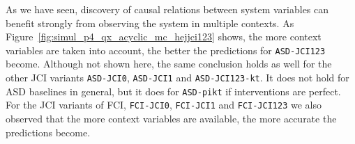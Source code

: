 \documentclass[twoside,11pt]{article}
\newcommand{\alg}[1]{\texttt{#1}}
\begin{document}
\begin{comment}
\texttt{[image: \{linear\_stochastic\_4\_x\_0.5\_0.5\_500\_1\_1\_LEG\_sys2sys\_edge\_hej-jci123]}.png}
}
\centerline{%
\texttt{[image: \{linear\_stochastic\_4\_x\_0.5\_0.5\_500\_1\_1\_ROC\_sys2sys\_conf\_hej-jci123]}.png}
\texttt{[image: \{linear\_stochastic\_4\_x\_0.5\_0.5\_500\_1\_1\_PR1\_sys2sys\_conf\_hej-jci123]}.png}
\texttt{[image: \{linear\_stochastic\_4\_x\_0.5\_0.5\_500\_1\_1\_PR0\_sys2sys\_conf\_hej-jci123]}.png}
\texttt{[image: \{linear\_stochastic\_4\_x\_0.5\_0.5\_500\_1\_1\_LEG\_sys2sys\_conf\_hej-jci123]}.png}
}
\caption{Taking into account more context variables leads to better predictions for \alg{ASD-JCI123}
(acyclic, perfect interventions).\label{fig:simul_p4_qx_acyclic_pi_hejjci123}}
\end{figure}
\begin{figure}
\centerline{%
\texttt{[image: \{linear\_stochastic\_4\_x\_0.5\_0.5\_500\_0\_1\_ROC\_sys2sys\_arel\_hej-jci123]}.png}
\texttt{[image: \{linear\_stochastic\_4\_x\_0.5\_0.5\_500\_0\_1\_PR1\_sys2sys\_arel\_hej-jci123]}.png}
\texttt{[image: \{linear\_stochastic\_4\_x\_0.5\_0.5\_500\_0\_1\_PR0\_sys2sys\_arel\_hej-jci123]}.png}
\texttt{[image: \{linear\_stochastic\_4\_x\_0.5\_0.5\_500\_0\_1\_LEG\_sys2sys\_arel\_hej-jci123]}.png}
}
\centerline{%
\texttt{[image: \{linear\_stochastic\_4\_x\_0.5\_0.5\_500\_0\_1\_ROC\_sys2sys\_edge\_hej-jci123]}.png}
\texttt{[image: \{linear\_stochastic\_4\_x\_0.5\_0.5\_500\_0\_1\_PR1\_sys2sys\_edge\_hej-jci123]}.png}
\texttt{[image: \{linear\_stochastic\_4\_x\_0.5\_0.5\_500\_0\_1\_PR0\_sys2sys\_edge\_hej-jci123]}.png}
\texttt{[image: \{linear\_stochastic\_4\_x\_0.5\_0.5\_500\_0\_1\_LEG\_sys2sys\_edge\_hej-jci123]}.png}
}
\centerline{%
\texttt{[image: \{linear\_stochastic\_4\_x\_0.5\_0.5\_500\_0\_1\_ROC\_sys2sys\_conf\_hej-jci123]}.png}
\texttt{[image: \{linear\_stochastic\_4\_x\_0.5\_0.5\_500\_0\_1\_PR1\_sys2sys\_conf\_hej-jci123]}.png}
\texttt{[image: \{linear\_stochastic\_4\_x\_0.5\_0.5\_500\_0\_1\_PR0\_sys2sys\_conf\_hej-jci123]}.png}
\texttt{[image: \{linear\_stochastic\_4\_x\_0.5\_0.5\_500\_0\_1\_LEG\_sys2sys\_conf\_hej-jci123]}.png}
}
\caption{Taking into account more context variables leads to better predictions for \alg{ASD-JCI123}
(cyclic, perfect interventions).\label{fig:simul_p4_qx_cyclic_pi_hejjci123}}
\end{figure}
\end{comment}

As we have seen, discovery of causal relations between system variables can benefit strongly from observing
the system in multiple contexts. As Figure~\ref{fig:simul_p4_qx_acyclic_mc_hejjci123}
shows, the more context variables are taken into account, the better the predictions for \alg{ASD-JCI123} become. 
Although not shown here, the same conclusion holds as well for the other JCI variants 
\alg{ASD-JCI0}, \alg{ASD-JCI1} and \alg{ASD-JCI123-kt}. It does not hold for ASD baselines in general, but
it does for \alg{ASD-pikt} if interventions are perfect. For the JCI variants of FCI, \alg{FCI-JCI0}, \alg{FCI-JCI1} and 
\alg{FCI-JCI123} we also observed that the more context variables are available, the more accurate the predictions become.
\end{document}
